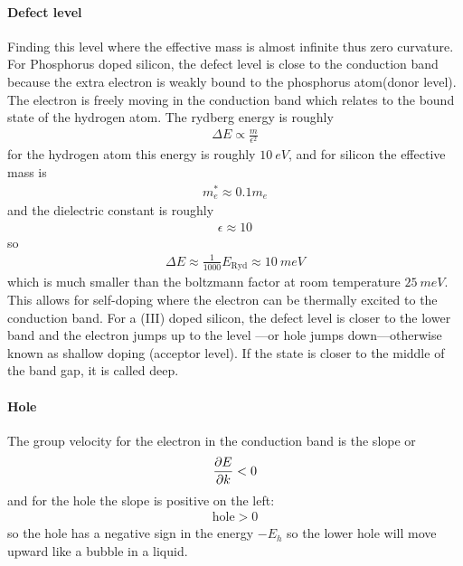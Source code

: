 \documentclass[../main.tex]{subfiles}
\begin{document}
\paragraph*{Defect level} Finding this level where the effective mass is almost infinite thus
zero curvature. For Phosphorus doped silicon, the defect level is close to the conduction band
because the extra electron is weakly bound to the phosphorus atom(donor level). The electron is freely moving
in the conduction band which relates to the bound state of the hydrogen atom. The rydberg energy
is roughly
\begin{align*}
    \Delta E \propto \frac{m}{\epsilon^2}
\end{align*}
for the hydrogen atom this energy is roughly $\qty{10}{eV}$, and for silicon the effective mass is
\begin{align*}
    m_e^* \approx 0.1 m_e
\end{align*}
and the dielectric constant is roughly
\begin{align*}
    \epsilon \approx 10
\end{align*}
so 
\begin{align*}
    \Delta E \approx \frac{1}{1000} E_{\text{Ryd}} \approx \qty{10}{meV}
\end{align*}
which is much smaller than the boltzmann factor at room temperature $\qty{25}{meV}$. This allows for
self-doping where the electron can be thermally excited to the conduction band. For a (III)
doped silicon, the defect level is closer to the lower band and the electron jumps up to the level
—or hole jumps down—otherwise known as shallow doping (acceptor level). If the state is closer to
the middle of the band gap, it is called deep.

\paragraph*{Hole} The group velocity for the electron in the conduction band is the slope or 
\begin{align*}
    \pdv{E}{k} < 0
\end{align*}
and for the hole the slope is positive on the left:
\begin{align*}
    \text{hole} > 0
\end{align*}
so the hole has a negative sign in the energy $-E_h$ so the lower hole will move upward like a
bubble in a liquid.
\end{document}
